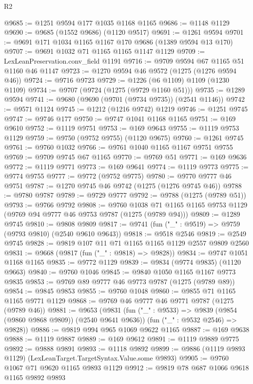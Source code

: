 \begin{lexlean}{R2}
\begin{coremodule}
@9685 := @1251 @9594 @177 @1035 @1168 @1165
@9686 := @1148 @1129
@9690 := @9685 (@1552 @9686) (@1120 @9517)
@9691 := @1261 @9594
@9701 := @9691 @171 @1034 @1165 @1167 @170 @9686 (@1389 @9594 @13 @170)
@9707 := @9691 @1032 @71 @1165 @1165 @1147 @1129
@9709 := LexLeanPreservation.conv_field @1191
@9716 := @9709 @9594 @67 @1165 @51 @1160 @46 @1147
@9723 := @1270 @9594 @46 @9572 (@1275 (@1276 @9594 @46))
@9724 := @9716 @9723
@9729 := @1226 (@6 @1109) @1109 (@1230 @1109)
@9734 := @9707 (@9724 (@1275 (@9729 @1160 @51)))
@9735 := @1289 @9594
@9741 := @9680 (@9690 (@9701 (@9734 @9735)) (@2541 @1146))
@9742 := @9571 @1124
@9745 := @1212 (@1216 @9742) @1219
@9746 := @1251 @9745
@9747 := @9746 @177
@9750 := @9747 @1041 @1168 @1165
@9751 := @169 @9610
@9752 := @1119 @9751
@9753 := @169 @9643
@9755 := @1119 @9753 @1129
@9759 := @9750 (@9752 @9755) (@1120 @9675)
@9760 := @1261 @9745
@9761 := @9760 @1032
@9766 := @9761 @1040 @1165 @1167 @9751 @9755
@9769 := @9709 @9745 @67 @1165
@9770 := @9769 @51
@9771 := @169 @9636
@9772 := @1119 @9771
@9773 := @169 @9641
@9774 := @1119 @9773
@9775 := @9774 @9755
@9777 := @9772 (@9752 @9775)
@9780 := @9770 @9777 @46 @9751
@9787 := @1270 @9745 @46 @9742 (@1275 (@1276 @9745 @46))
@9788 := @9780 @9787
@9789 := @9729 @9777
@9792 := @9788 (@1275 (@9789 @51))
@9793 := @9766 @9792
@9808 := @9760
    @1038
    @71
    @1165
    @1165
    @9753
    @1129
    (@9769 @94 @9777 @46 @9753 @9787 (@1275 (@9789 @94)))
@9809 := @1289 @9745
@9810 := @9808 @9809
@9817 := @9741 (fun ("_" : @9519) => @9759 (@9793 @9810) (@2540 @9610 @9643))
@9818 := @9518 @2546
@9819 := @2549 @9745
@9828 := @9819 @107 @11 @71 @1165 @1165 @1129 @2557 @9809 @2560
@9831 := @9668 (@9817 (fun ("_" : @9818) => @9828))
@9834 := @9747 @1051 @1168 @1165
@9835 := @9772 @1129
@9839 := @9834 (@9774 @9835) (@1120 @9663)
@9840 := @9760 @1046
@9845 := @9840 @1050 @1165 @1167 @9773 @9835
@9853 := @9769 @89 @9777 @46 @9773 @9787 (@1275 (@9789 @89))
@9854 := @9845 @9853
@9855 := @9760 @1048
@9860 := @9855 @71 @1165 @1165 @9771 @1129
@9868 := @9769 @46 @9777 @46 @9771 @9787 (@1275 (@9789 @46))
@9881 := @9653
    (@9831
      (fun ("_" : @9533) => @9839 (@9854 (@9860 @9868 @9809)) (@2540 @9641 @9636))
      (fun ("_" : @9532 @2546) => @9828))
@9886 := @9819 @994 @965 @1069 @9622 @1165
@9887 := @169 @9638
@9888 := @1119 @9887
@9889 := @169 @9612
@9891 := @1119 @9889 @9775
@9892 := @9888 @9891
@9893 := @1118 @9892
@9899 := @9886 (@1119 @9893 @1129) (LexLeanTarget.TargetSyntax.Value.some @9893)
@9905 := @9760 @1067 @71 @9620 @1165 @9893 @1129
@9912 := @9819 @78 @687 @1066 @9618 @1165 @9892 @9893

\end{coremodule}
\end{lexlean}
